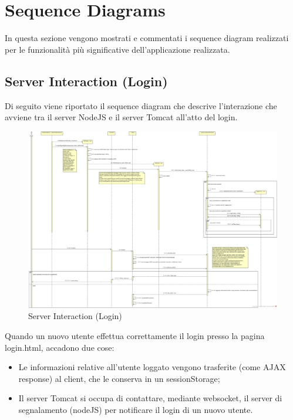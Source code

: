 
\textual


\section{Sequence Diagrams}

In questa sezione vengono mostrati e commentati i sequence diagram realizzati per le funzionalità più significative dell'applicazione realizzata.

\subsection{Server Interaction (Login)}

Di seguito viene riportato il sequence diagram che descrive l'interazione che avviene tra il server NodeJS e il server Tomcat all'atto del login.\\

\begin{figure}[H]
	\centering
	\includegraphics[scale = .6]{img/sequence_serverint.png}
	\caption{Server Interaction (Login)}
	\label{gfx:serverinteractionlogin}
\end{figure}

Quando un nuovo utente effettua correttamente il login presso la pagina login.html, accadono due cose:
\begin{itemize}
\item Le informazioni relative all'utente loggato vengono trasferite (come AJAX response) al client, che le conserva in un sessionStorage;
\item Il server Tomcat si occupa di contattare, mediante websocket, il server di segnalamento (nodeJS) per notificare il login di un nuovo utente.
\end{itemize}

